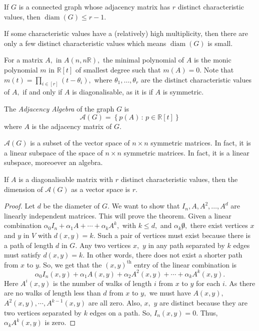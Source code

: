 \begin{theorem}
	If $G$ is a connected graph whose adjacency matrix has $r$ 
	distinct characteristic values, then $\operatorname{diam}(G)
	\leq r-1.$
\end{theorem}

\begin{remark}
	If some characteristic values have a (relatively) high
	multiplicity, then there are only a few distinct characteristic
	values which means $\operatorname{diam}(G)$ is small.
\end{remark}
For a matrix $A,$ in $A(n,n \mathbb{R}),$ the minimal
polynomial of $A$ is the monic polynomial $m$ in $\mathbb{R}[t]$
of smallest degree such that $m(A) = 0.$
Note that $m(t) = \prod_{i \in [r]} (t - \theta_i),$  where
$\theta_1, \dotsc, \theta_r$ are the distinct characteristic values
of $A,$ if and only if $A$ is diagonalisable, as it is if $A$ is
symmetric.
\begin{definition}
	The \emph{Adjacency Algebra} of the graph $G$ is 
	$$ \mathcal{A}(G) = \left\{ p(A) \, : \, p \in \mathbb{R}[t] 
	\right\} $$
	where $A$ is the adjacency matrix of $G.$
\end{definition}

\begin{remark}
	$\mathcal{A}(G)$ is a subset of the vector space of
	$n \times n$ symmetric matrices. In fact, it is a linear 
	subspace of the space of $n \times n$ symmetric matrices.
	In fact, it is a linear subspace, moreoever an algebra.
\end{remark}

If $A$ is a diagonalisable matrix with $r$ distinct characteristic 
values, then the dimension of $\mathcal{A}(G)$ as a vector space is $r.$
\begin{proof}
	Let $d$ be the diameter of $G.$ We want to show that
	$I_n, A, A^2, \dots, A^d$ are linearly independent matrices.
	This will prove the theorem.
	Given a linear combination
	$\alpha_0 I_n + \alpha_1 A + \cdots + \alpha_k A^k,$
	with $k \leq d,$ and $\alpha_k \not 0,$
	there exist vertices $x$ and $y$ in $V$ with $d(x,y) = k.$
	Such a pair of vertices must exist because there is a path of length $d$ in $G.$
	Any two vertices $x,$ $y$ in any path separated by $k$ edges
	must satisfy $d(x,y) = k.$
	In other words, there does not exist a shorter path
	from $x$ to $y.$ So, we get that the $(x,y)^\text{th}$ entry 
	of the linear combination
	is $$ \alpha_0 I_n(x,y) + \alpha_1 A(x,y) + \alpha_2 A^2(x,y)
	+ \cdots + \alpha_k A^k(x,y).$$
	Here $A^i(x,y)$ is the number of walks of length $i$ from $x$
	to $y$ for each $i.$ As there are no walks of length less than
	$d$ from $x$ to $y,$ we must have $A(x,y),$ $A^2(x,y), \cdots,
	A^{k-1}(x,y)$ are all zero. Also, $x,$ $y$ are distinct because
	they are two vertices separated by $k$ edges on a path. So,
	$I_n(x,y) = 0.$ Thus, $\alpha_k A^k(x,y)$ is zero.
\end{proof}

